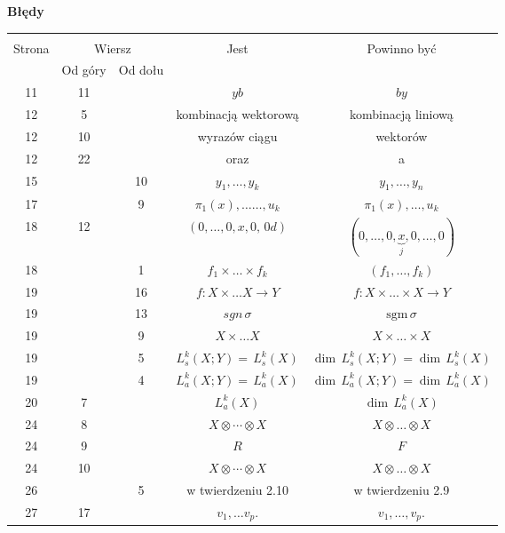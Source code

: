 \documentclass[a4paper,11pt]{article}
\newcommand{\mr}{\mathrm}
\newcommand{\ub}{\underbrace}
\newcommand{\ra}{\rightarrow}
\newcommand{\ld}{\ldots}
\newcommand{\ti}{\times}
\newcommand{\ot}{\otimes}
\newcommand{\sgm}{\mr{sgm}}
\newcommand{\s}{\sigma}
\newcommand{\tb}{\textbf}
\newcommand{\Center}[1]{\begin{center} #1 \end{center}}
\newcommand{\CenterTB}[1]{\Center{\tb{#1}}}
\begin{document}
\newpage
\CenterTB{Błędy}
\begin{center}
  \begin{tabular}{|c|c|c|c|c|}
    \hline
    & \multicolumn{2}{c|}{} & & \\
    Strona & \multicolumn{2}{c|}{Wiersz} & Jest
                              & Powinno być \\ \cline{2-3}
    & Od góry & Od dołu &  &  \\
    \hline
    11 & 11 & & $y b$ & $b y$ \\
    12 &  5 & & kombinacją wektorową &  kombinacją liniową \\
    12 & 10 & & wyrazów ciągu & wektorów \\
    12 & 22 & & oraz & a \\
    15 & & 10 & $y_{ 1 }, \ld , y_{ k }$ & $y_{ 1 }, \ld , y_{ n }$ \\
    17 & &  9 & $\pi_{ 1 }( x ), \ld\ld, u_{ k }$ & $\pi_{ 1 }( x ), \ld,
                                                    u_{ k }$ \\
    18 & 12 & & $( 0, \ld, 0, x, 0, \, 0d )$
           & $( 0, \ld, 0, \ub{ x }_{ j }, 0, \ld, 0 )$ \\
    18 & & 1 & $f_{ 1 } \ti \ld \ti f_{ k }$ & $( f_{ 1 }, \ld,
                                               f_{ k } )$ \\
    19 & & 16 & $f : X \ti \ld X \ra Y$ & $f : X \ti \ld \ti X \ra Y$ \\
    19 & & 13 & $sgn\, \s$ & $\sgm\, \s$ \\
    19 & &  9 & $X \ti \ld X$ & $X \ti \ld \ti X$ \\
    19 & &  5 & $L^{ k }_{ s } ( X; Y ) = \, L^{ k }_{ s } ( X )$
           & $\dim \, L^{ k }_{ s } ( X; Y )
             = \dim \, L^{ k }_{ s } ( X )$ \\
    19 & &  4 & $L^{ k }_{ a } ( X; Y ) = \, L^{ k }_{ a } ( X )$
           & $\dim \, L^{ k }_{ a } ( X; Y )
             = \dim \, L^{ k }_{ a } ( X )$ \\
    20 &  7 & & $L_{ a }^{ k }( X )$ & $\dim \, L_{ a }^{ k }( X )$ \\
    24 &  8 & & $X \ot \cdots \ot X$ & $X \ot \ld \ot X$ \\
    24 &  9 & & $R$ & $F$ \\
    24 & 10 & & $X \ot \cdots \ot X$ & $X \ot \ld \ot X$ \\
    26 & &  5 & w twierdzeniu 2.10 & w twierdzeniu 2.9 \\
    27 & 17 & & $v_{ 1 }, \ld v_{ p }$. & $v_{ 1 }, \ld, v_{ p }$. \\

\end{tabular}
\end{center}
\end{document}
